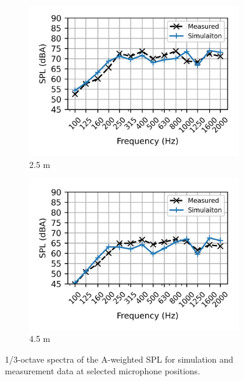 \begin{figure}[H] \ContinuedFloat
	\begin{subfigure}[b]{0.49\textwidth}
		\centering
		\includegraphics{fig/chap5/initial_model/freq_spectrum/pos_10cm_2pt5m.png}
		\caption{2.5 m}
	\end{subfigure}
	\hfill
	\begin{subfigure}[b]{0.49\textwidth}
		\centering
		\includegraphics{fig/chap5/initial_model/freq_spectrum/pos_10cm_4pt5m.png}
		\caption{4.5 m}
	\end{subfigure}
	\caption{1/3-octave spectra of the A-weighted SPL for simulation and measurement data at selected microphone positions.}
	\label{fig:freq_spectrum}
\end{figure}

